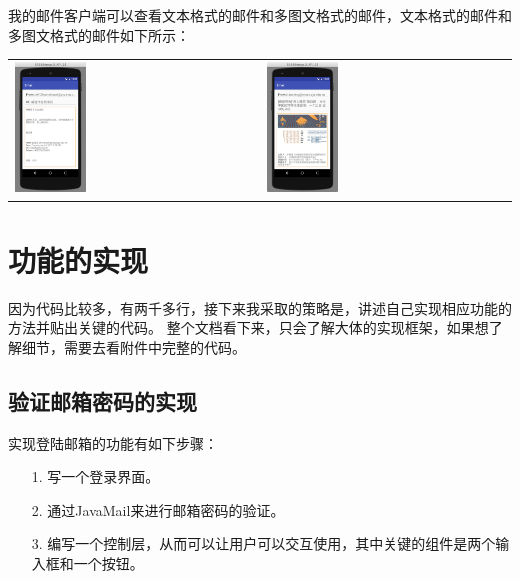 \documentclass[a4paper,left=2.5cm,right=2.5cm,11pt]{article}
\begin{document}
	我的邮件客户端可以查看文本格式的邮件和多图文格式的邮件，文本格式的邮件和多图文格式的邮件如下所示：
	\begin{longtable}{p{}p{}}
	\includegraphics[width=0.3\textwidth]{8.png} &
	\includegraphics[width=0.3\textwidth]{9.png} \\
	\end{longtable}

\section{功能的实现}
	因为代码比较多，有两千多行，接下来我采取的策略是，讲述自己实现相应功能的方法并贴出关键的代码。
	整个文档看下来，只会了解大体的实现框架，如果想了解细节，需要去看附件中完整的代码。

\subsection{验证邮箱密码的实现}
	实现登陆邮箱的功能有如下步骤：
	\begin{itemize}
		\item[1.] 写一个登录界面。
		\item[2.] 通过JavaMail来进行邮箱密码的验证。
		\item[3.] 编写一个控制层，从而可以让用户可以交互使用，其中关键的组件是两个输入框和一个按钮。
	\end{itemize}
\end{document}
